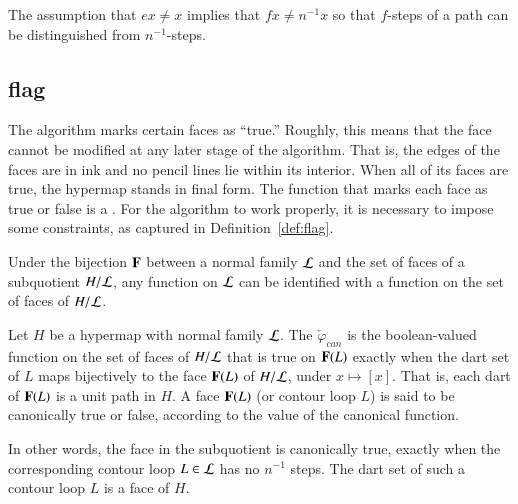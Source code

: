 \begin{remark}
The assumption that $e x \ne x$ implies that $f x \ne n^{-1} x$ so that $f$-steps of a 
path can be distinguished from $n^{-1}$-steps.
\end{remark}


\subsection{flag}
%

The algorithm marks certain faces as ``true.''  Roughly, this means that
the face cannot be modified at any later stage of the algorithm.
That is, the edges of the faces are in ink and no pencil lines lie
within its interior.  When all of its faces are true, the hypermap
stands in final form.  The function that marks each face as true or
false is a .  For the algorithm to work properly, it is
necessary to impose some constraints, as captured in
Definition~\ref{def:flag}.  %


Under the bijection ${\mathbf F}$ between a normal family ${\cal L}$ and the
set of faces of a subquotient $H/{\cal L}$, any function 
on ${\cal L}$ can be identified with a function  on the
set of faces of $H/{\cal L}$.   

\begin{definition}
Let $H$ be a hypermap with normal family $\cal
  L$.  The  $\check\varphi_{can}$ is the
  boolean-valued function on the set of faces of $H/{\cal L}$ that is
  true on ${\mathbf F}(L)$ exactly when the dart set of $L$ maps bijectively to
  the face ${\mathbf F}(L)$ of $H/{\cal L}$, under $x\mapsto [x]$.  That is,
  each dart of ${\mathbf F}(L)$ is a unit path in $H$.  A face ${\mathbf F}(L)$ (or
  contour loop $L$) is said to be canonically true or false, according
  to the value of the canonical function.
\end{definition}
%


In other words, the face in the subquotient is canonically true, exactly
when the corresponding contour loop $L\in {\cal L}$ has no $n^{-1}$
steps.  The dart set of such a contour loop $L$ is a face of $H$.  


